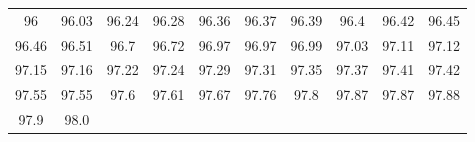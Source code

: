 \documentclass{article}
\begin{document}
\begin{enumerate}


    

    
    
    
    
    
    


\end{enumerate}

 \begin{tabular}{|cccccccccc|}\hline 96&96.03&96.24&96.28&96.36&96.37&96.39&96.4&96.42&96.45\\ 96.46&96.51&96.7&96.72&96.97&96.97&96.99&97.03&97.11&97.12\\ 97.15&97.16&97.22&97.24&97.29&97.31&97.35&97.37&97.41&97.42\\ 97.55&97.55&97.6&97.61&97.67&97.76&97.8&97.87&97.87&97.88\\ 97.9&98.0&&&&&&&&\\\hline\end{tabular}
\end{document}
